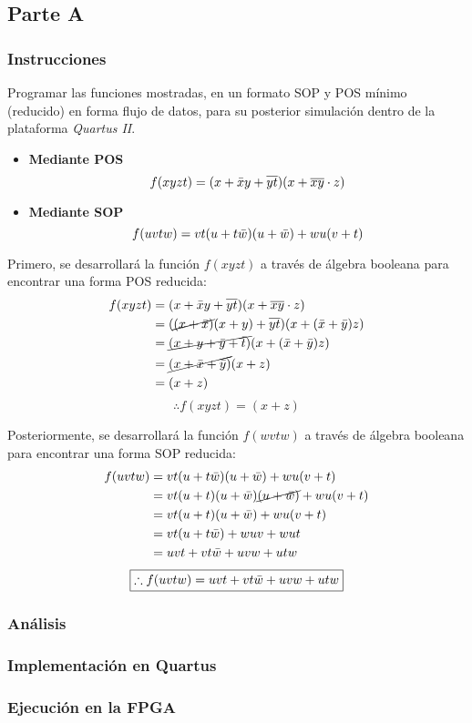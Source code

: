 \documentclass[../procedimientos.tex]{subfiles}
\begin{document}
\clearpage
\subsection{Parte A}
\subsubsection{Instrucciones}
\begin{em}
  Programar las funciones mostradas, en un formato SOP y POS mínimo (reducido) 
  en forma flujo de datos, para su posterior simulación dentro de la 
  plataforma \textit{Quartus II}.
  \begin{itemize}
    \item \textbf{Mediante POS}
      \begin{equation*}
        f(xyzt) = (x + \bar{x}y + \overline{yt})(x + \overline{xy}\cdot z)
      \end{equation*}
    \item \textbf{Mediante SOP}
      \begin{equation*}
        f(uvtw) = vt(u+t\bar{w})(u+\bar{w})+wu(v+t)
      \end{equation*}
  \end{itemize}
\end{em}

Primero, se desarrollará la función $f(xyzt)$ a través de álgebra booleana 
para encontrar una forma POS reducida:
\begin{align*}
  f(xyzt) &= (x + \bar{x}y + \overline{yt})(x + \overline{xy}\cdot z)\\
  &= (\cancel{(x+\bar{x})}(x+y) + \overline{yt})(x + (\bar{x}+\bar{y})z)\\
  &= \cancel{(x+y + \bar{y} + \bar{t})}(x + (\bar{x}+\bar{y})z)\\
  &= \cancel{(x+\bar{x}+\bar{y})}(x+z)\\
  &= (x+z)
\end{align*}
\begin{equation*}
  \boxed{
    \therefore f(xyzt) = (x+z)
  }
\end{equation*}

Posteriormente, se desarrollará la función $f(wvtw)$ a través de álgebra 
booleana para encontrar una forma SOP reducida:
\begin{align*}
  f(uvtw) &= vt(u+t\bar{w})(u+\bar{w})+wu(v+t)\\
  &= vt(u+t)(u+\bar{w})\cancel{(u+\bar{w})}+wu(v+t)\\
  &= vt(u+t)(u+\bar{w})+wu(v+t)\\
  &= vt(u+t\bar{w})+wuv+wut\\
  &= uvt+vt\bar{w}+uvw+utw
\end{align*}
\begin{equation*}
  \boxed{
    \therefore f(uvtw) = uvt+vt\bar{w}+uvw+utw
  }
\end{equation*}

\subsubsection{Análisis}\label{subs:analisis_a}
\subsubsection{Implementación en Quartus}\label{subs:a_imp}
\subsubsection{Ejecución en la FPGA}
\end{document}
